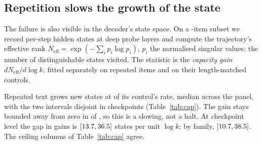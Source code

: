 \documentclass{article}
\begin{document}
\subsection{Repetition slows the growth of the state}
\label{sec:cap}

The failure is also visible in the decoder's state space. On a
\NInstrumented{}-item subset we record per-step hidden
states at deep probe layers and compute the trajectory's effective rank
$N_{\mathrm{eff}} = \exp(-\sum_i p_i \log p_i)$, $p_i$ the normalised
singular values: the number of distinguishable states visited.
The statistic is the \emph{capacity gain} $dN_{\mathrm{eff}}/d\log k$,
fitted separately on repeated items and on their length-matched
controls.

Repeated text grows new states at \CapRatio{} of its control's rate, median
across the panel, with the two intervals disjoint in \CapSepPhrase{}
checkpoints (Table~\ref{tab:cap}). The gain stays bounded away from zero in \CapPosModels{} of
\NCapModels{}, so this is a slowing, not a halt. At
checkpoint level the gap in gains is \CkCap{} $[13.7{},36.5{}]$
states per unit $\log k$; by family, \FamCap{} $[10.7{},38.5{}]$. The ceiling columns of Table~\ref{tab:cap} agree.
\end{document}
